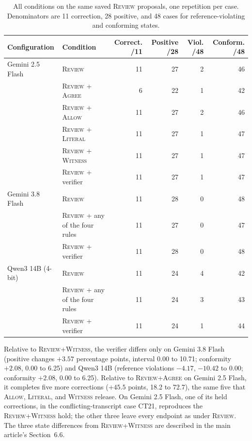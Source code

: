 \documentclass[acmsmall,review]{acmart}
\newcommand{\agree}{\textsc{Agree}}
\newcommand{\allow}{\textsc{Allow}}
\newcommand{\literal}{\textsc{Literal}}
\newcommand{\witness}{\textsc{Witness}}
\newcommand{\review}{\textsc{Review}}
\begin{document}
\begin{table}[H]
\centering
\caption{All conditions on the same saved \review{} proposals, one repetition per case. Denominators are 11 correction, 28 positive, and 48 cases for reference-violating and conforming states.}\label{tab:M2}
\small
\setlength{\tabcolsep}{3pt}
\begin{tabular}{@{}llrrrr@{}}
\toprule
\textbf{Configuration} & \textbf{Condition} & \textbf{Correct. /11} & \textbf{Positive /28} & \textbf{Viol. /48} & \textbf{Conform. /48} \\
\midrule
Gemini 2.5 Flash & \review{} & 11 & 27 & 2 & 46 \\
 & \review{} + \agree{} & 6 & 22 & 1 & 42 \\
 & \review{} + \allow{} & 11 & 27 & 2 & 46 \\
 & \review{} + \literal{} & 11 & 27 & 1 & 47 \\
 & \review{} + \witness{} & 11 & 27 & 1 & 47 \\
 & \review{} + verifier & 11 & 27 & 1 & 47 \\
\addlinespace[2pt]
Gemini 3.8 Flash & \review{} & 11 & 28 & 0 & 48 \\
 & \review{} + any of the four rules & 11 & 27 & 0 & 47 \\
 & \review{} + verifier & 11 & 28 & 0 & 48 \\
\addlinespace[2pt]
Qwen3 14B (4-bit) & \review{} & 11 & 24 & 4 & 42 \\
 & \review{} + any of the four rules & 11 & 24 & 3 & 43 \\
 & \review{} + verifier & 11 & 24 & 1 & 44 \\
\bottomrule
\end{tabular}
\end{table}

Relative to \review{}+\witness{}, the verifier differs only on Gemini 3.8 Flash (positive changes $+3.57$ percentage points, interval 0.00 to 10.71; conformity $+2.08$, 0.00 to 6.25) and Qwen3 14B (reference violations $-4.17$, $-10.42$ to 0.00; conformity $+2.08$, 0.00 to 6.25). Relative to \review{}+\agree{} on Gemini 2.5 Flash, it completes five more corrections ($+45.5$ points, 18.2 to 72.7), the same five that \allow{}, \literal{}, and \witness{} release. On Gemini 2.5 Flash, one of its held corrections, in the conflicting-transcript case CT21, reproduces the \review{}+\witness{} hold; the other three leave every endpoint as under \review{}. The three state differences from \review{}+\witness{} are described in the main article's Section~6.6.
\end{document}
